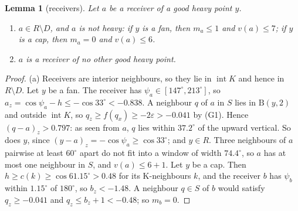 \documentclass[11pt]{amsart}
\newtheorem{lemma}[theorem]{Lemma}
\theoremstyle{definition}
\theoremstyle{remark}
\newcommand{\eps}{\varepsilon}
\newcommand{\Dd}{\mathrm{B}}      %
\begin{document}
\begin{lemma}[receivers]\label{lem:receivers}
Let $a$ be a receiver of a good heavy point $y$.
\begin{enumerate}[label=\textup{(\alph*)}]
\item $a\in R\setminus D$, and $a$ is not heavy: if $y$ is a fan, then $m_a\le1$ and $v(a)\le7$; if $y$ is a cap, then $m_a=0$ and $v(a)\le6$.
\item $a$ is a receiver of no other good heavy point.
\end{enumerate}
\end{lemma}
\begin{proof}
(a) Receivers are interior neighbours, so they lie in $\operatorname{int}K$ and hence in $R\setminus D$. Let $y$ be a fan. The receiver has $\psi_a\in[147^\circ,213^\circ]$, so $a_z=\cos\psi_a-h\le-\cos33^\circ<-0.838$. A neighbour $q$ of $a$ in $S$ lies in $\Dd(y,2)$ and outside $\operatorname{int}K$, so $q_z\ge f(q_x)\ge-2\eps>-0.041$ by (G1). Hence $(q-a)_z>0.797$: as seen from $a$, $q$ lies within $37.2^\circ$ of the upward vertical. So does $y$, since $(y-a)_z=-\cos\psi_a\ge\cos33^\circ$; and $y\in R$. Three neighbours of $a$ pairwise at least $60^\circ$ apart do not fit into a window of width $74.4^\circ$, so $a$ has at most one neighbour in $S$, and $v(a)\le6+1$. Let $y$ be a cap. Then $h\ge c(k)\ge\cos61.15^\circ>0.48$ for its K-neighbours $k$, and the receiver $b$ has $\psi_b$ within $1.15^\circ$ of $180^\circ$, so $b_z<-1.48$. A neighbour $q\in S$ of $b$ would satisfy $q_z\ge-0.041$ and $q_z\le b_z+1<-0.48$; so $m_b=0$.


\end{proof}
\end{document}
